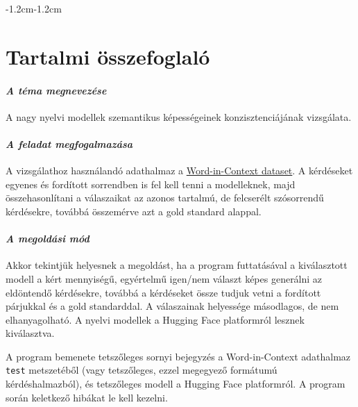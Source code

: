 \documentclass[12pt]{report}
\begin{document}
\begin{adjustwidth}{-1.2cm}{-1.2cm} %
\begingroup
{} %
\fontsize{10.5pt}{12.2pt}\selectfont %

    \chapter*{Tartalmi összefoglaló}

    \subsubsection{\textit{A téma megnevezése}}
    A nagy nyelvi modellek szemantikus
    képességeinek konzisztenciájának vizsgálata.

    \subsubsection{\textit{A feladat megfogalmazása}}
    A vizsgálathoz használandó adathalmaz a \href{https://pilehvar.github.io/wic/}{Word-in-Context dataset}.
    A kérdéseket egyenes és fordított sorrendben is fel kell tenni a modelleknek, majd összehasonlítani a válaszaikat az azonos tartalmú, de felcserélt szósorrendű kérdésekre, továbbá összemérve azt a gold standard alappal. %

    \subsubsection{\textit{A megoldási mód}}
    Akkor tekintjük helyesnek a megoldást, ha a program futtatásával a kiválasztott modell a kért mennyiségű, egyértelmű igen/nem választ képes generálni az eldöntendő kérdésekre, továbbá a kérdéseket össze tudjuk vetni a fordított párjukkal és a gold standarddal.
    A válaszainak helyessége másodlagos, de nem elhanyagolható.
    A nyelvi modellek a Hugging Face platformról lesznek kiválasztva.

    A program bemenete tetszőleges sornyi bejegyzés a Word-in-Context adathalmaz \texttt{\allowbreak test} metszetéből (vagy tetszőleges, ezzel megegyező formátumú kérdéshalmazból), és tetszőleges modell a Hugging Face platformról. A program során keletkező hibákat le kell kezelni.


\end{adjustwidth}
\end{document}
